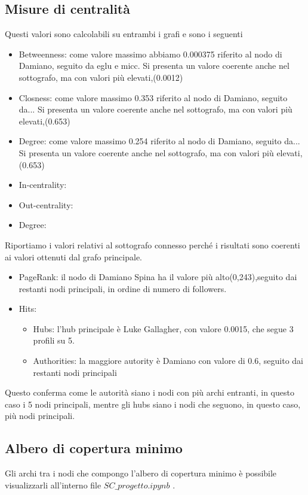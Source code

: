 \documentclass[a4paper,11pt]{report}
\begin{document}
\subsection{Misure di centralità}
Questi valori sono calcolabili su entrambi i grafi e sono i seguenti
		\begin{itemize}
			\item Betweenness: come valore massimo abbiamo 0.000375 riferito al nodo di Damiano, seguito da eglu e micc. Si presenta un valore coerente anche nel sottografo, ma con valori più elevati,(0.0012)
			\item Closness: come valore massimo 0.353 riferito al nodo di Damiano, seguito da... Si presenta un valore coerente anche nel sottografo, ma con valori più elevati,(0.653)
			\item Degree: come valore massimo 0.254 riferito al nodo di Damiano, seguito da... Si presenta un valore coerente anche nel sottografo, ma con valori più elevati,(0.653)
			\item In-centrality: 
			\item Out-centrality: 
			\item Degree: 
		\end{itemize}
	Riportiamo i valori relativi al sottografo connesso perché i risultati sono coerenti ai valori ottenuti dal grafo principale.
		\begin{itemize}
		
			\item PageRank: il nodo di Damiano Spina ha il valore più alto(0,243),seguito dai restanti nodi principali, in ordine di numero di followers.
			\item Hits: 
				\begin{itemize}
					\item Hubs: l'hub principale è Luke Gallagher, con valore 0.0015, che segue 3 profili su 5.
					\item Authorities: la maggiore autority è Damiano con valore di 0.6, seguito dai restanti nodi principali
			\end{itemize}
		\end{itemize}
	Questo conferma come le autorità siano i nodi con più archi entranti, in questo caso i 5 nodi principali, mentre gli hubs siano i nodi che seguono, in questo caso, più nodi principali.
\subsection{Albero di copertura minimo}
Gli archi tra i nodi che compongo l'albero di copertura minimo è possibile visualizzarli all'interno file $SC\_progetto.ipynb$ .
\end{document}
